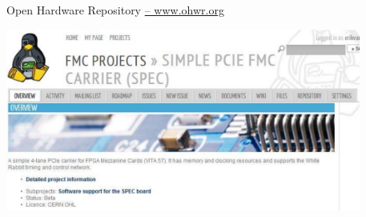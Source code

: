 \documentclass[compress,red]{beamer}
\begin{document}
\begin{frame}{Open Hardware Repository \href{http://ohwr.org}{-- www.ohwr.org}}

 \begin{center}
   \includegraphics[height=6cm]{ohwr/ohr_spec_top.pdf}
 \end{center} 

\end{frame}
\end{document}
